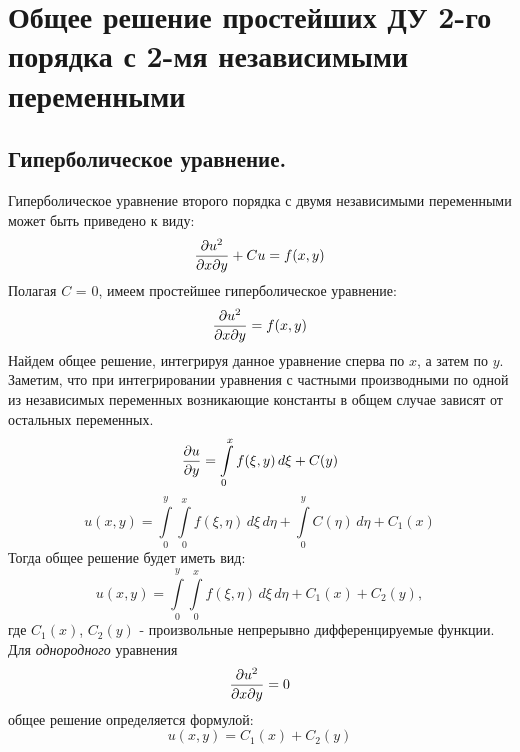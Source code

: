 \documentclass[../main.tex]{subfiles}
\begin{document}
\section{Общее решение простейших ДУ 2-го порядка с 2-мя независимыми переменными}
\subsection{Гиперболическое уравнение.}
Гиперболическое уравнение второго порядка с двумя независимыми переменными может быть приведено к виду:
\[
    \pderivTwo{u}{x}{y} + Cu = f(x, y)
\]
Полагая $C$ = 0, имеем простейшее гиперболическое уравнение:
\begin{equation}
    \pderivTwo{u}{x}{y} = f(x, y)
\end{equation}
Найдем общее решение, интегрируя данное уравнение сперва по $x$, а затем по $y$. \\Заметим, что при интегрировании уравнения с частными производными по одной из независимых переменных возникающие константы в общем случае зависят от остальных переменных.
\[
    \frac{\partial u}{\partial y} = \int\limits_{0}^{x}f(\xi, y)\,d\xi + C(y)
\]
\[
    u(x,y) = \int\limits_{0}^{y}\int\limits_{0}^{x}f(\xi, \eta)\,d\xi\,d\eta + \int\limits_{0}^{y}C(\eta)\,d\eta + C_1(x)
\]
Тогда общее решение будет иметь вид:
\begin{equation}
        u(x,y) = \int\limits_{0}^{y}\int\limits_{0}^{x}f(\xi, \eta)\,d\xi\,d\eta + C_1(x) + C_2(y),
\end{equation}
где $C_1(x)$, $C_2(y)$ - произвольные непрерывно дифференцируемые функции.\\
Для \textit{однородного} уравнения
\[
    \pderivTwo{u}{x}{y} = 0
\]
общее решение определяется формулой:
\[
        u(x,y) = C_1(x) + C_2(y)
\]
\end{document}
